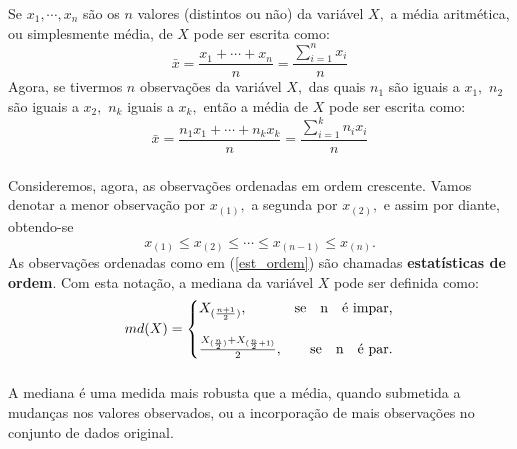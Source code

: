 \documentclass[14pt,aspectratio=1610]{beamer}
\newcommand{\bx}{\ensuremath{\bar{x}}}
\begin{document}
\begin{frame}{}
\frametitle{}
\begin{block}{}
\justifying
Se $x_{1},\cdots,x_{n}$ são os $n$ valores (distintos ou não) da variável $X,$ a média aritmética, ou simplesmente média, de $X$ pode ser escrita como:
\begin{equation}
\bx=\dfrac{x_{1}+\cdots+x_{n}}{n}=\dfrac{\displaystyle \sum_{i=1}^{n}{x_{i}}}{n}
\end{equation}
Agora, se tivermos $n$ observações da variável $X,$ das quais $n_{1}$ são iguais a $x_{1},$ $n_{2}$ são iguais
a $x_{2},$ $n_{k}$ iguais a $x_{k},$ então a média de $X$ pode ser escrita como:
\begin{equation}
\bx=\dfrac{n_{1}x_{1}+\cdots+n_{k}x_{k}}{n}=\dfrac{\displaystyle \sum_{i=1}^{k}n_{i}x_{i}}{n}
\end{equation}
\end{block}
\end{frame}

\begin{frame}{}
\frametitle{}
\begin{block}{}
\justifying
Consideremos, agora, as observações ordenadas em ordem crescente. Vamos denotar a
menor observação por $x_{(1)},$ a segunda por $x_{(2)},$ e assim por diante, obtendo-se
\begin{equation}\label{est_ordem}
x_{(1)}\leq x_{(2)}\leq \cdots \leq x_{(n-1)}\leq x_{(n)}.
\end{equation}
As observações ordenadas como em (\ref{est_ordem}) são chamadas {\bf estatísticas de ordem}. Com esta notação, a mediana da variável $X$ pode ser definida como:
\[
md(X)=\left\{
\setlength\arraycolsep{0pt}
\begin{array}{lr}
X_{(\frac{n+1}{2})},                                             &\quad \textrm{se}\quad $n$\quad \textrm{é impar,}\\
&\\
\frac{X_{(\frac{n}{2})}+X_{(\frac{n}{2}+1)}}{2},  &\quad \textrm{se}\quad $n$\quad \textrm{é par.}\\
\end{array}
\right.
\]
\end{block}
\end{frame}

\begin{frame}{}
\frametitle{}
\begin{block}{}
\justifying
A mediana é uma medida mais robusta que a média, quando submetida a mudanças nos valores observados, ou a incorporação de mais observações no conjunto de dados original.
\end{block}
\end{frame}
\end{document}

